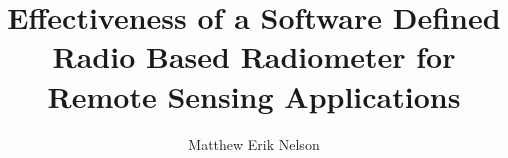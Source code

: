 \title{Effectiveness of a Software Defined Radio Based Radiometer for Remote Sensing Applications}
\author{Matthew Erik Nelson}
\notice
\maketitle
